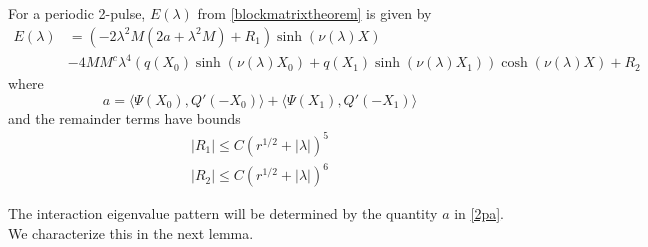 \documentclass[thesis.tex]{subfiles}
\begin{document}
\begin{corollary}\label{2blockmatrix}
For a periodic 2-pulse, $E(\lambda)$ from \cref{blockmatrixtheorem} is given by
\begin{equation}\label{2detBeq}
\begin{aligned}
E(\lambda) &= \left(-2 \lambda^2 M (2a + \lambda^2 M) + R_1 \right) \sinh(\nu(\lambda)X) \\
&-4 M M^c \lambda^4 ( q(X_0) \sinh(\nu(\lambda)X_0) + q(X_1) \sinh(\nu(\lambda)X_1) ) \cosh(\nu(\lambda)X)  + R_2
\end{aligned}
\end{equation}
where
\begin{equation}\label{2pa}
a = \langle \Psi(X_0), Q'(-X_0) \rangle + \langle \Psi(X_1), Q'(-X_1) \rangle
\end{equation}
and the remainder terms have bounds
\begin{align*}
|R_1| \leq C(r^{1/2} + |\lambda|)^5 \\
|R_2| \leq C(r^{1/2} + |\lambda|)^6
\end{align*}
\end{corollary}

The interaction eigenvalue pattern will be determined by the quantity $a$ in \cref{2pa}. We characterize this in the next lemma.
\end{document}
